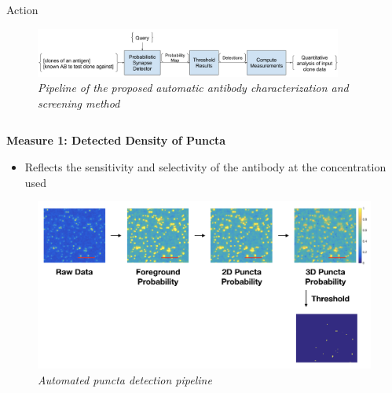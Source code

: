\documentclass[final, table]{beamer}
\newlength{\onecolwid}
\newlength{\twocolwid}
\begin{document}
\begin{frame}[t]
\begin{columns}[t]
\begin{column}{\twocolwid}
\begin{block}{Action}
\begin{figure}
\centering
\includegraphics[width=0.9\textwidth]{figs/ABWorkflow}
\caption{\textit{Pipeline of the proposed automatic antibody characterization and screening method}}
\label{fig:pipeline}
\end{figure}


\begin{columns}[t]  %

\begin{column}{\onecolwid}


\textbf{Measure 1: Detected Density of Puncta} 

\begin{itemize} 
\item Reflects the sensitivity and selectivity of the antibody at the concentration used
\end{itemize} 

\begin{figure}
\centering
\includegraphics[width=1\textwidth]{figs/3dpuncta_pipeline}
\caption{\textit{Automated puncta detection pipeline} }
\end{figure}



\end{column}
\end{columns}
\end{block}
\end{column}
\end{columns}
\end{frame}
\end{document}
